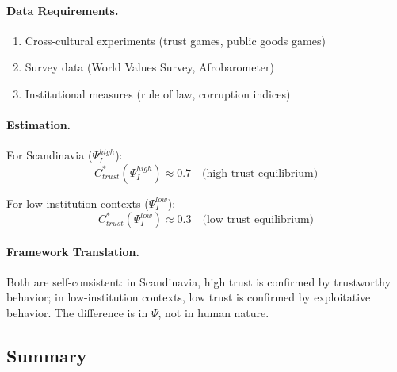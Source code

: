 \paragraph{Data Requirements.}
\begin{enumerate}
    \item Cross-cultural experiments (trust games, public goods games)
    \item Survey data (World Values Survey, Afrobarometer)
    \item Institutional measures (rule of law, corruption indices)
\end{enumerate}

\paragraph{Estimation.}
For Scandinavia ($\Psi_I^{high}$):
\begin{equation}
C^*_{trust}(\Psi_I^{high}) \approx 0.7 \quad \text{(high trust equilibrium)}
\end{equation}

For low-institution contexts ($\Psi_I^{low}$):
\begin{equation}
C^*_{trust}(\Psi_I^{low}) \approx 0.3 \quad \text{(low trust equilibrium)}
\end{equation}

\paragraph{Framework Translation.}
Both are self-consistent: in Scandinavia, high trust is confirmed by
trustworthy behavior; in low-institution contexts, low trust is confirmed
by exploitative behavior. The difference is in $\Psi$, not in human nature.




\subsection{Summary}

